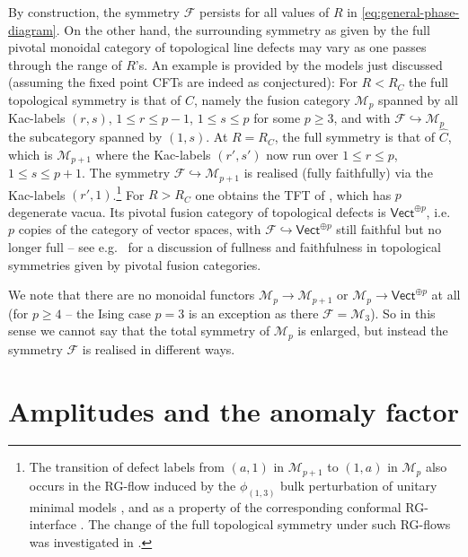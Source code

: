 \documentclass[11pt,a4paper]{article}
\numberwithin{equation}{section}
\begin{document}
\smallskip
By construction, the symmetry $\mathcal{F}$ persists for all values of $R$ in \eqref{eq:general-phase-diagram}. On the other hand, the surrounding symmetry as given by the full pivotal monoidal category of topological line defects may vary as one passes through the range of $R$'s. 
An example is provided by the models just discussed (assuming the fixed point CFTs are indeed as conjectured): For $R<R_C$ the full topological symmetry is that of $C$, namely the fusion category $\mathcal{M}_p$ spanned by all Kac-labels $(r,s)$, $1\le r\le p-1$, $1 \le s \le p$ for some $p \ge 3$, and with $\mathcal{F} \hookrightarrow \mathcal{M}_{p}$ the subcategory spanned by $(1,s)$. At $R=R_C$, the full symmetry is that of $\widehat C$, which is $\mathcal{M}_{p+1}$ where the Kac-labels $(r',s')$ now run over $1\le r\le p$, $1 \le s \le p+1$. The symmetry $\mathcal{F} \hookrightarrow \mathcal{M}_{p+1}$ is realised (fully faithfully) via the Kac-labels $(r',1)$.\footnote{
    The transition of defect labels from $(a,1)$ in $\mathcal{M}_{p+1}$ to $(1,a)$ in $\mathcal{M}_p$ also occurs in the RG-flow induced by the $\phi_{(1,3)}$ bulk perturbation of unitary minimal models \cite[Sec.\,4.1]{Fredenhagen:2009tn}, and as a property of the corresponding conformal RG-interface \cite{Gaiotto:2012np}. The change of the full topological symmetry under such RG-flows was investigated in \cite{Kikuchi:2021qxz}. 
}
For $R>R_C$ one obtains the TFT of \cite[Sec.\,3]{Brehm:2021wev}, which has $p$ degenerate vacua. Its pivotal fusion category of topological defects is $\mathsf{Vect}^{\oplus p}$, i.e.\ $p$ copies of the category of vector spaces, with $\mathcal{F} \hookrightarrow \mathsf{Vect}^{\oplus p}$ still faithful but no longer full -- see e.g.\ \cite[Sec.\,3]{Carqueville:2023jhb} for a discussion of fullness and faithfulness in topological symmetries given by pivotal fusion categories. 

We note that there are no monoidal functors $\mathcal{M}_p \to \mathcal{M}_{p+1}$ or $\mathcal{M}_p \to \mathsf{Vect}^{\oplus p}$ at all (for $p \ge 4$ -- the Ising case $p=3$ is an exception as there $\mathcal{F} = \mathcal{M}_3$). So in this sense we cannot say that the total symmetry of $\mathcal{M}_p$ is enlarged, but instead the symmetry $\mathcal{F}$ is realised in different ways.





\section{Amplitudes and the anomaly factor}\label{sec:anomaly-factor}
\end{document}
